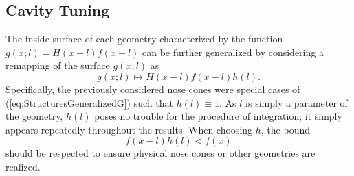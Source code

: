\documentclass[11pt,dvipsnames]{thesis}
\begin{document}
\subsection{Cavity Tuning}
The inside surface of each geometry characterized by the function $g(x; l) = H(x - l)f(x - l)$ can be further generalized by considering a remapping of the surface $g(x; l)$ as
\begin{equation}
g(x; l) \mapsto H(x - l) f(x - l) h(l). \label{eq:StructuresGeneralizedG}
\end{equation}
Specifically, the previously considered nose cones were special cases of (\ref{eq:StructuresGeneralizedG}) such that $h(l) \equiv 1$. As $l$ is simply a parameter of the geometry, $h(l)$ poses no trouble for the procedure of integration; it simply appears repeatedly throughout the results. When choosing $h$, the bound
\begin{equation}
f(x - l)h(l) < f(x)
\end{equation}
should be respected to ensure physical nose cones or other geometries are realized.
\end{document}
